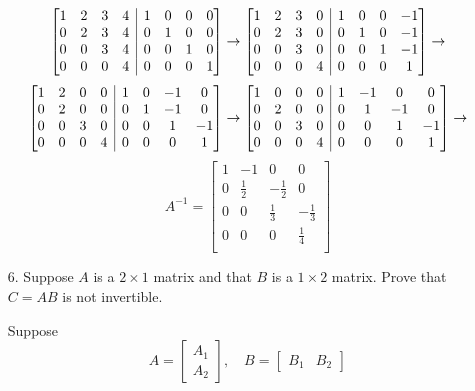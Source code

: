 \documentclass{article}
\makeatletter
\newenvironment{abmatrix}[2]
{
    \left[
        \begin{array} {@{} *{#1}{c} | *{#2}c @{}}
}
{
        \end{array}
    \right]
}
\makeatother
\begin{document}
\begin{enumerate}[listparindent=\parindent]
\[
    \begin{abmatrix}{4}{4}
        1 & 2 & 3 & 4 & 1 & 0 & 0 & 0 \\
        0 & 2 & 3 & 4 & 0 & 1 & 0 & 0 \\
        0 & 0 & 3 & 4 & 0 & 0 & 1 & 0 \\
        0 & 0 & 0 & 4 & 0 & 0 & 0 & 1
    \end{abmatrix}
    \rightarrow
    \begin{abmatrix}{4}{4}
        1 & 2 & 3 & 0 & 1 & 0 & 0 & -1 \\
        0 & 2 & 3 & 0 & 0 & 1 & 0 & -1 \\
        0 & 0 & 3 & 0 & 0 & 0 & 1 & -1 \\
        0 & 0 & 0 & 4 & 0 & 0 & 0 & 1
    \end{abmatrix}
    \rightarrow
\]
\[
    \begin{abmatrix}{4}{4}
        1 & 2 & 0 & 0 & 1 & 0 & -1 & 0 \\
        0 & 2 & 0 & 0 & 0 & 1 & -1 & 0 \\
        0 & 0 & 3 & 0 & 0 & 0 & 1 & -1 \\
        0 & 0 & 0 & 4 & 0 & 0 & 0 & 1
    \end{abmatrix}
    \rightarrow
    \begin{abmatrix}{4}{4}
        1 & 0 & 0 & 0 & 1 & -1 & 0 & 0 \\
        0 & 2 & 0 & 0 & 0 & 1 & -1 & 0 \\
        0 & 0 & 3 & 0 & 0 & 0 & 1 & -1 \\
        0 & 0 & 0 & 4 & 0 & 0 & 0 & 1
    \end{abmatrix}
    \rightarrow
\]
\[
    \boxed {
        A^{-1} =
        \begin{bmatrix}
            1 & -1 & 0 & 0 \\
            0 & \frac{1}{2} & -\frac{1}{2} & 0 \\
            0 & 0 & \frac{1}{3} & -\frac{1}{3} \\
            0 & 0 & 0 & \frac{1}{4} \\
        \end{bmatrix}
    }
\]

\item[6.] Suppose \(A\) is a \(2 \times 1\) matrix and that \(B\) is a \(1 \times 2\) matrix. Prove that \(C = AB\) is not invertible.

Suppose
\[
    A = \begin{bmatrix}
        A_1 \\ A_2
    \end{bmatrix}, \quad
    B = \begin{bmatrix}
        B_1 & B_2
    \end{bmatrix}
\]


\end{enumerate}
\end{document}
